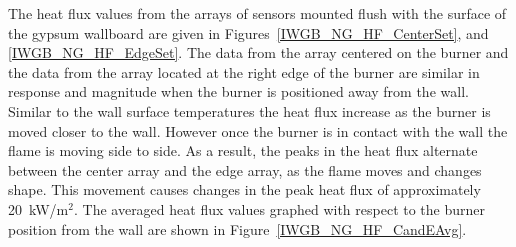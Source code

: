 \documentclass[twoside]{uocthesis}
\begin{document}
\clearpage

The heat flux values from the arrays of sensors mounted flush with the surface of the gypsum wallboard are given in Figures~\ref{IWGB_NG_HF_CenterSet}, and \ref{IWGB_NG_HF_EdgeSet}.  The data from the array centered on the burner and the data from the array located at the right edge of the burner are similar in response and magnitude when the burner is positioned away from the wall.  Similar to the wall surface temperatures the heat flux increase as the burner is moved closer to the wall.  However once the burner is in contact with the wall the flame is moving side to side.  As a result, the peaks in the heat flux alternate between the center array and the edge array, as the flame moves and changes shape.  This movement causes changes in the peak heat flux of approximately 20~kW/m$^2$.  The averaged heat flux values graphed with respect to the burner position from the wall are shown in Figure~\ref{IWGB_NG_HF_CandEAvg}.     
\end{document}
